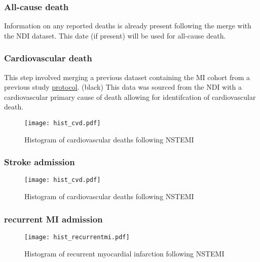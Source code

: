 \documentclass[11pt]{article}
\begin{document}
\subsubsection{All-cause death}
Information on any reported deaths is already present following the merge with the NDI dataset. This date (if present) will be used for all-cause death.
\subsubsection{Cardiovascular death}
This step involved merging a previous dataset containing the MI cohort from a previous study \color{blue} \href{https://github.com/cardiopharmnerd/medsremote}{protocol}. \color(black) This data was sourced from the NDI with a cardiovascular primary cause of death allowing for identifcation of cardiovascular death. 
\begin{stlog}\end{stlog}
\color{black}
\begin{figure} [h]
	\centering
	\texttt{[image: hist\_cvd.pdf]}
	\caption{Histogram of cardiovascular deaths following NSTEMI}
	\label{hist_cvd}
\end{figure}
\pagebreak
\subsubsection{Stroke admission}
\color{violet}
\begin{stlog}\end{stlog}
\color{black}
\begin{figure} [h]
	\centering
	\texttt{[image: hist\_cvd.pdf]}
	\caption{Histogram of cardiovascular deaths following NSTEMI}
	\label{hist_cvd}
\end{figure}
\color{violet}
\begin{stlog}\end{stlog}
\color{black}
\subsubsection{recurrent MI admission}
\color{violet}
\begin{stlog}\end{stlog}
\color{black}
\begin{figure} [h]
	\centering
	\texttt{[image: hist\_recurrentmi.pdf]}
	\caption{Histogram of recurrent myocardial infarction following NSTEMI}
	\label{hist_recurrentmi}
\end{figure}
\end{document}

